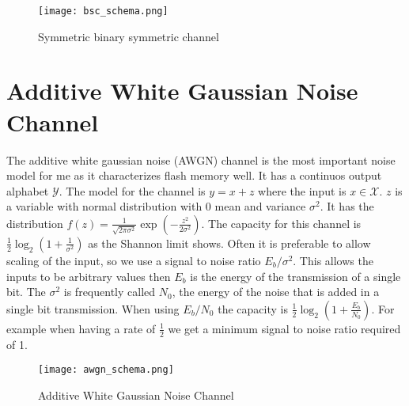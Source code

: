 \begin{figure}
	\texttt{[image: bsc\_schema.png]}
	\centering
	\caption{Symmetric binary symmetric channel}
	\label{bsc_schema}
\end{figure}

\section{Additive White Gaussian Noise Channel}
The additive white gaussian noise (AWGN) channel is the most important noise model for me as it characterizes flash memory well. It has a continuos output alphabet $\mathcal{Y}$. The model for the channel is $y = x + z$ where the input is $x \in \mathcal{X}$. $z$ is a variable with normal distribution with $0$ mean and variance $\sigma^2$. It has the distribution $f(z) = \frac{1}{\sqrt{2 \pi \sigma^2}}\exp(-\frac{z^2}{2 \sigma^2})$. The capacity for this channel is $\frac{1}{2} \log_2(1 + \frac{1}{\sigma^2})$ as the Shannon limit shows. Often it is preferable to allow scaling of the input, so we use a signal to noise ratio $E_b / \sigma^2$. This allows the inputs to be arbitrary values then $E_b$ is the energy of the transmission of a single bit. The $\sigma^2$ is frequently called $N_0$, the energy of the noise that is added in a single bit transmission. When using $E_b / N_0$ the capacity is $\frac{1}{2} \log_2(1 + \frac{E_b}{N_0})$. For example when having a rate of $\frac{1}{2}$ we get a minimum signal to noise ratio required of 1.

\begin{figure}
	\texttt{[image: awgn\_schema.png]}
	\centering
	\caption{Additive White Gaussian Noise Channel}
	\label{awgn_schema}
\end{figure}
